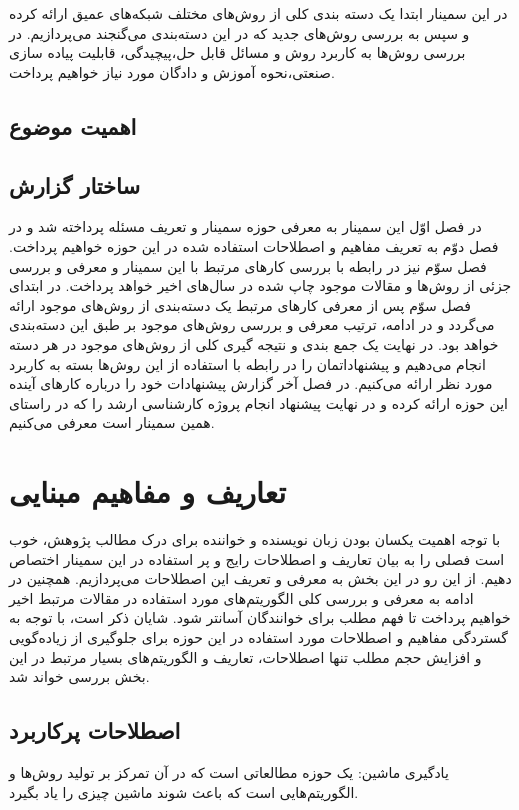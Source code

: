 \documentclass[12pt,a4paper]{report}
\theoremstyle{definition}
\theoremstyle{theorem}
\theoremstyle{definition}
\begin{document}
در این سمینار ابتدا یک دسته بندی کلی از روش‌های مختلف شبکه‌های عمیق ارائه کرده و سپس به بررسی روش‌های جدید که در این دسته‌بندی می‌گنجند می‌پردازیم.
در بررسی روش‌ها به کاربرد روش و مسائل قابل حل،‌پیچیدگی، قابلیت پیاده سازی صنعتی،‌نحوه آموزش و دادگان مورد نیاز خواهیم پرداخت.
	\section{اهمیت موضوع}
	
	\section{ساختار گزارش}
در فصل اوّل این سمینار به معرفی حوزه سمینار و تعریف مسئله پرداخته شد و در فصل دوّم به تعریف مفاهیم و اصطلاحات استفاده شده در این حوزه خواهیم پرداخت. فصل سوّم نیز در رابطه با بررسی کار‌های مرتبط با این سمینار و معرفی و بررسی جزئی از روش‌ها و مقالات موجود چاپ شده در سال‌های اخیر خواهد پرداخت. در ابتدای فصل سوّم پس از معرفی کار‌های مرتبط یک دسته‌بندی از روش‌های موجود ارائه می‌گردد و در ادامه، ترتیب معرفی و بررسی روش‌های موجود بر طبق این دسته‌بندی خواهد بود. در نهایت یک جمع بندی و نتیجه گیری کلی از روش‌های موجود در هر دسته انجام می‌دهیم و پیشنهاداتمان را در رابطه با استفاده از این روش‌ها بسته به کاربرد مورد نظر ارائه می‌کنیم. در فصل آخر گزارش پیشنهادات خود را درباره کار‌های آینده این حوزه ارائه کرده و در نهایت پیشنهاد انجام پروژه کارشناسی ارشد را که در راستای همین سمینار است معرفی می‌کنیم.
	\chapter{تعاریف و مفاهیم مبنایی}
	با توجه اهمیت یکسان بودن زبان نویسنده و خواننده برای درک مطالب پژوهش، خوب است فصلی را به بیان تعاریف و اصطلاحات رایج و پر استفاده در این سمینار اختصاص دهیم. از این رو در این بخش به معرفی و تعریف این اصطلاحات می‌پردازیم. همچنین در ادامه به معرفی و بررسی کلی الگوریتم‌های مورد استفاده در مقالات مرتبط اخیر خواهیم پرداخت تا فهم مطلب برای خوانندگان آسانتر شود. شایان ذکر است، با توجه به گستردگی مفاهیم و اصطلاحات مورد استفاده در این حوزه برای جلوگیری از زیاده‌گویی و افزایش حجم مطلب تنها اصطلاحات، تعاریف و الگوریتم‌های بسیار مرتبط در این بخش بررسی خواند شد.
	\section{اصطلاحات پرکاربرد}
		{\titr یادگیری ماشین:}
		یک حوزه مطالعاتی است که در آن تمرکز بر تولید روش‌ها و الگوریتم‌هایی است که باعث شوند ماشین چیزی را یاد بگیرد.\\
		
\end{document}
